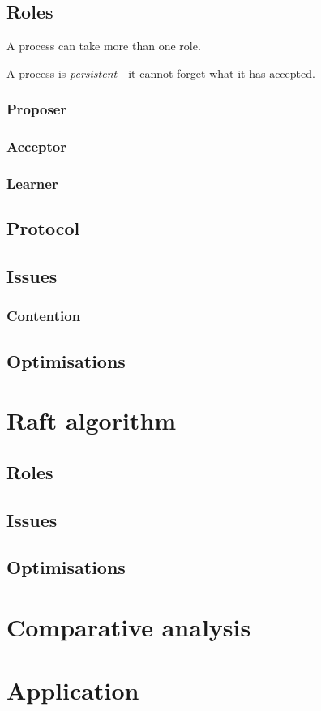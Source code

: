 \documentclass[12pt, a4paper]{article}
\begin{document}
\subsection{Roles}

A process can take more than one role.

A process is \textit{persistent}---it cannot forget what it has accepted.

  \subsubsection{Proposer}

  \subsubsection{Acceptor}

  \subsubsection{Learner}

\subsection{Protocol}

\subsection{Issues}

  \subsubsection{Contention}

\subsection{Optimisations}



\section{Raft algorithm}

\subsection{Roles}

\subsection{Issues}

\subsection{Optimisations}


\section{Comparative analysis}


\section{Application}






\end{document}
